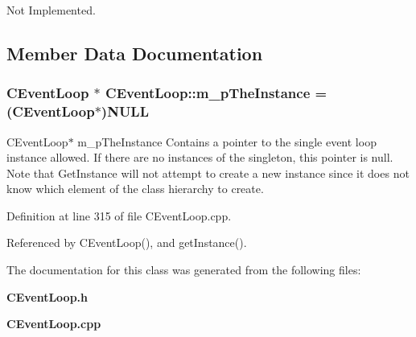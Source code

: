 Not Implemented.



\subsection{Member Data Documentation}
\subsubsection{\setlength{\rightskip}{0pt plus 5cm}CEvent\-Loop $\ast$ CEvent\-Loop::m\_\-p\-The\-Instance = (CEvent\-Loop$\ast$)NULL\hspace{0.3cm}{\tt  [static, private]}}\label{classCEventLoop_r0}


CEvent\-Loop$\ast$ m\_\-p\-The\-Instance Contains a pointer to the single event loop instance allowed. If there are no instances of the singleton, this pointer is null. Note that Get\-Instance will not attempt to create a new instance since it does not know which element of the class hierarchy to create. 

Definition at line 315 of file CEvent\-Loop.cpp.

Referenced by CEvent\-Loop(), and get\-Instance().

The documentation for this class was generated from the following files:\begin{CompactItemize}
\item 
{\bf CEvent\-Loop.h}\item 
{\bf CEvent\-Loop.cpp}\end{CompactItemize}

